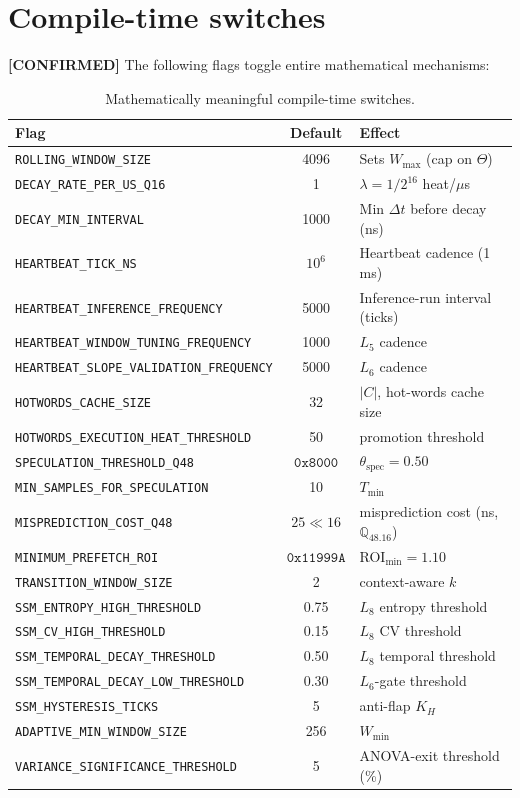 \documentclass[11pt,letterpaper,openany]{book}
\theoremstyle{definition}
\theoremstyle{plain}
\newcommand{\confirmed}{\textcolor{green!50!black}{\textbf{[CONFIRMED]}}\xspace}
\newcommand{\Qfp}{\mathbb{Q}_{48.16}}                %
\newcommand{\Wmax}{W_{\mathrm{max}}}
\newcommand{\Wmin}{W_{\mathrm{min}}}
\newcommand{\Loop}[1]{L_{#1}}
\begin{document}
\section{Compile-time switches}

\confirmed The following flags toggle entire mathematical mechanisms:

\begin{table}[H]
  \centering\small
  \begin{tabular}{l c l}
    \toprule
    Flag & Default & Effect \\
    \midrule
    \texttt{ROLLING\_WINDOW\_SIZE}     & 4096 & Sets $\Wmax$ (cap on $\Theta$) \\
    \texttt{DECAY\_RATE\_PER\_US\_Q16} & 1    & $\lambda = 1/2^{16}$ heat/$\mu$s \\
    \texttt{DECAY\_MIN\_INTERVAL}      & 1000 & Min $\Delta t$ before decay (ns) \\
    \texttt{HEARTBEAT\_TICK\_NS}       & $10^6$ & Heartbeat cadence (1 ms) \\
    \texttt{HEARTBEAT\_INFERENCE\_FREQUENCY} & 5000 & Inference-run interval (ticks) \\
    \texttt{HEARTBEAT\_WINDOW\_TUNING\_FREQUENCY} & 1000 & $\Loop{5}$ cadence \\
    \texttt{HEARTBEAT\_SLOPE\_VALIDATION\_FREQUENCY} & 5000 & $\Loop{6}$ cadence \\
    \texttt{HOTWORDS\_CACHE\_SIZE}     & 32   & $|C|$, hot-words cache size \\
    \texttt{HOTWORDS\_EXECUTION\_HEAT\_THRESHOLD} & 50 & promotion threshold \\
    \texttt{SPECULATION\_THRESHOLD\_Q48} & $\mathtt{0x8000}$ & $\theta_{\mathrm{spec}}=0.50$ \\
    \texttt{MIN\_SAMPLES\_FOR\_SPECULATION} & 10 & $T_{\min}$ \\
    \texttt{MISPREDICTION\_COST\_Q48}  & $25\ll 16$ & misprediction cost (ns, $\Qfp$) \\
    \texttt{MINIMUM\_PREFETCH\_ROI}    & $\mathtt{0x11999A}$ & ROI$_{\min}=1.10$ \\
    \texttt{TRANSITION\_WINDOW\_SIZE}  & 2    & context-aware $k$ \\
    \texttt{SSM\_ENTROPY\_HIGH\_THRESHOLD} & 0.75 & $\Loop{8}$ entropy threshold \\
    \texttt{SSM\_CV\_HIGH\_THRESHOLD}      & 0.15 & $\Loop{8}$ CV threshold \\
    \texttt{SSM\_TEMPORAL\_DECAY\_THRESHOLD} & 0.50 & $\Loop{8}$ temporal threshold \\
    \texttt{SSM\_TEMPORAL\_DECAY\_LOW\_THRESHOLD} & 0.30 & $\Loop{6}$-gate threshold \\
    \texttt{SSM\_HYSTERESIS\_TICKS}    & 5 & anti-flap $K_H$ \\
    \texttt{ADAPTIVE\_MIN\_WINDOW\_SIZE} & 256 & $\Wmin$ \\
    \texttt{VARIANCE\_SIGNIFICANCE\_THRESHOLD} & 5 & ANOVA-exit threshold (\%) \\
    \bottomrule
  \end{tabular}
  \caption{Mathematically meaningful compile-time switches.}
\end{table}
\end{document}
